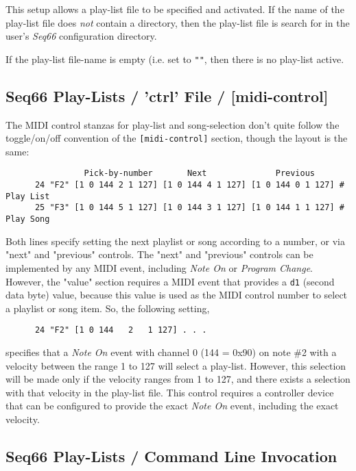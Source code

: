    This setup allows a play-list file to be specified and activated.
   If the name of the play-list file does \textsl{not} contain a directory,
   then the play-list file is search for in the user's \textsl{Seq66}
   configuration directory.

   If the play-list file-name is empty (i.e. set to \texttt{""}, then there is
   no play-list active.

\subsection{Seq66 Play-Lists / 'ctrl' File / [midi-control]}
\label{subsec:playlist_rc_file_midi_ctrl}

   The MIDI control stanzas for play-list and song-selection don't quite follow
   the toggle/on/off convention of the \texttt{[midi-control]} section, though
   the layout is the same:

   \begin{verbatim}
                Pick-by-number       Next              Previous
      24 "F2" [1 0 144 2 1 127] [1 0 144 4 1 127] [1 0 144 0 1 127] # Play List
      25 "F3" [1 0 144 5 1 127] [1 0 144 3 1 127] [1 0 144 1 1 127] # Play Song
   \end{verbatim}

   Both lines specify setting the next playlist or song according to a number,
   or via "next" and "previous" controls.  The "next" and "previous" controls
   can be implemented by any MIDI event, including \textsl{Note On} or
   \textsl{Program Change}.  However, the "value" section requires a MIDI event
   that provides a \texttt{d1} (second data byte) value, because this value is
   used as the MIDI control number to select a playlist or song item.
   So, the following setting,

   \begin{verbatim}
      24 "F2" [1 0 144   2   1 127] . . .
   \end{verbatim}

   specifies that a \textsl{Note On} event with channel 0 (144 = 0x90) on note
   \#2 with a velocity between the range 1 to 127 will select a play-list.
   However, this selection will be made only if the velocity ranges from 1 to
   127, and there exists a selection with that velocity in the play-list file.
   This control requires a controller device that can be configured to provide
   the exact \textsl{Note On} event, including the exact velocity.

\subsection{Seq66 Play-Lists / Command Line Invocation}
\label{subsec:playlist_cmd_line}

